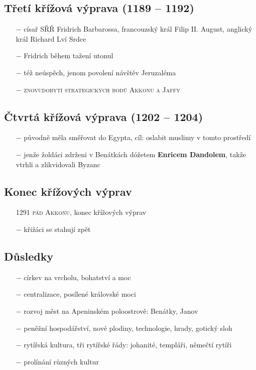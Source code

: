 \documentclass{article}
\begin{document}
\subsection*{Třetí křížová výprava (1189 -- 1192)}
\begin{itemize}
    \vspace{-0.5em}
    \setlength\itemsep{0.15em}
    \item[$-$] císař SŘŘ Fridrich Barbarossa, francouzský král Filip II. August, anglický král Richard Lví Srdce
    \item[$-$] Fridrich během tažení utonul
    \item[$-$] též neúspěch, jenom povolení návštěv Jeruzaléma
    \item[$-$] \textsc{znovudobytí strategických bodů Akkonu a Jaffy}
\end{itemize}


\subsection*{Čtvrtá křížová výprava (1202 -- 1204)}
\begin{itemize}
    \vspace{-0.5em}
    \setlength\itemsep{0.15em}
    \item[$-$] původně měla směřovat do Egypta, cíl: oslabit muslimy v tomto prostředí
    \item[$-$] jenže žoldáci zdrženi v Benátkách dóžetem \textbf{Enricem Dandolem}, takže vtrhli a zlikvidovali Byzanc
\end{itemize}


\subsection*{Konec křížových výprav}
\begin{itemize}
    \vspace{-0.5em}
    \setlength\itemsep{0.15em}
    \item[1291] \textsc{pád Akkonu}, konec křížových výprav
    \item[$-$] křižáci se stahují zpět
\end{itemize}


\subsection*{Důsledky}
\begin{itemize}
    \vspace{-0.5em}
    \setlength\itemsep{0.15em}
    \item[$-$] církev na vrcholu, bohatství a moc
    \item[$-$] centralizace, posílené královské moci
    \item[$-$] rozvoj měst na Apeninském poloostrově: Benátky, Janov
    \item[$-$] peněžní hospodářství, nové plodiny, technologie, hrady, gotický sloh
    \item[$-$] rytířská kultura, tři rytířské řády: johanité, templáři, němečtí rytíři
    \item[$-$] prolínání různých kultur
\end{itemize}
\end{document}
